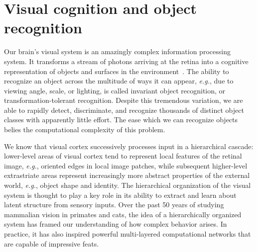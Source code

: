 

\section{Visual cognition and object recognition}
Our brain's visual system is an amazingly complex information processing system. It transforms a stream of photons arriving at the retina into a cognitive representation of objects and surfaces in the environment~\cite{DiCarlo2007, Cox2014}. The ability to recognize an object across the multitude of ways it can appear, \textit{e.g.}, due to viewing angle, scale, or lighting, is called invariant object recognition, or transformation-tolerant recognition. Despite this tremendous variation, we are able to rapidly detect, discriminate, and recognize thousands of distinct object classes with apparently little effort. The ease which we can recognize objects belies the computational complexity of this problem. 

We know that visual cortex successively processes input in a hierarchical cascade: lower-level areas of visual cortex tend to represent local features of the retinal image, \textit{e.g.}, oriented edges in local image patches, while subsequent higher-level extrastriate areas represent increasingly more abstract properties of the external world, \textit{e.g.}, object shape and identity. The hierarchical organization of the visual system is thought to play a key role in its ability to extract and learn about latent structure from sensory inputs. Over the past 50 years of studying mammalian vision in primates and cats\cite{Hubel1962}, the idea of a hierarchically organized system has framed our understanding of how complex behavior arises. In practice, it has also inspired powerful multi-layered computational networks that are capable of impressive feats\cite{Riesenhuber1999, Krizhevsky2012}.

